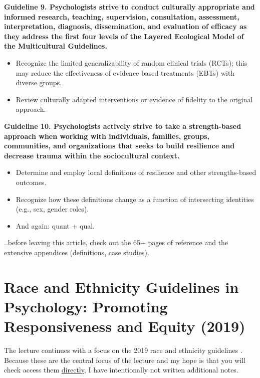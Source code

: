 \documentclass[
  english,
]{book}
\providecommand{\tightlist}{%
  \setlength{\itemsep}{0pt}\setlength{\parskip}{0pt}}
\begin{document}
\textbf{Guideline 9. Psychologists strive to conduct culturally appropriate and informed research, teaching, supervision, consultation, assessment, interpretation, diagnosis, dissemination, and evaluation of efficacy as they address the first four levels of the Layered Ecological Model of the Multicultural Guidelines.}

\begin{itemize}
\tightlist
\item
  Recognize the limited generalizability of random clinical trials (RCTs); this may reduce the effectiveness of evidence based treatments (EBTs) with diverse groups.
\item
  Review culturally adapted interventions or evidence of fidelity to the original approach.
\end{itemize}

\textbf{Guideline 10. Psychologists actively strive to take a strength-based approach when working with individuals, families, groups, communities, and organizations that seeks to build resilience and decrease trauma within the sociocultural context.}

\begin{itemize}
\tightlist
\item
  Determine and employ local definitions of resilience and other strengths-based outcomes.
\item
  Recognize how these definitions change as a function of intersecting identities (e.g., sex, gender roles).
\item
  And again: quant + qual.
\end{itemize}

..before leaving this article, check out the 65+ pages of reference and the extensive appendices (definitions, case studies).

\hypertarget{race-and-ethnicity-guidelines-in-psychology-promoting-responsiveness-and-equity-2019}{%
\section{Race and Ethnicity Guidelines in Psychology: Promoting Responsiveness and Equity (2019)}\label{race-and-ethnicity-guidelines-in-psychology-promoting-responsiveness-and-equity-2019}}

The lecture continues with a focus on the 2019 race and ethnicity guidelines \citep{apa_task_force_on_race_and_ethnicity_guidelines_in_psychology_apa_2019}. Because these are the central focus of the lecture and my hope is that you will check access them \href{https://www.apa.org/about/policy/guidelines-race-ethnicity.pdf}{directly}, I have intentionally not written additional notes.
\end{document}
